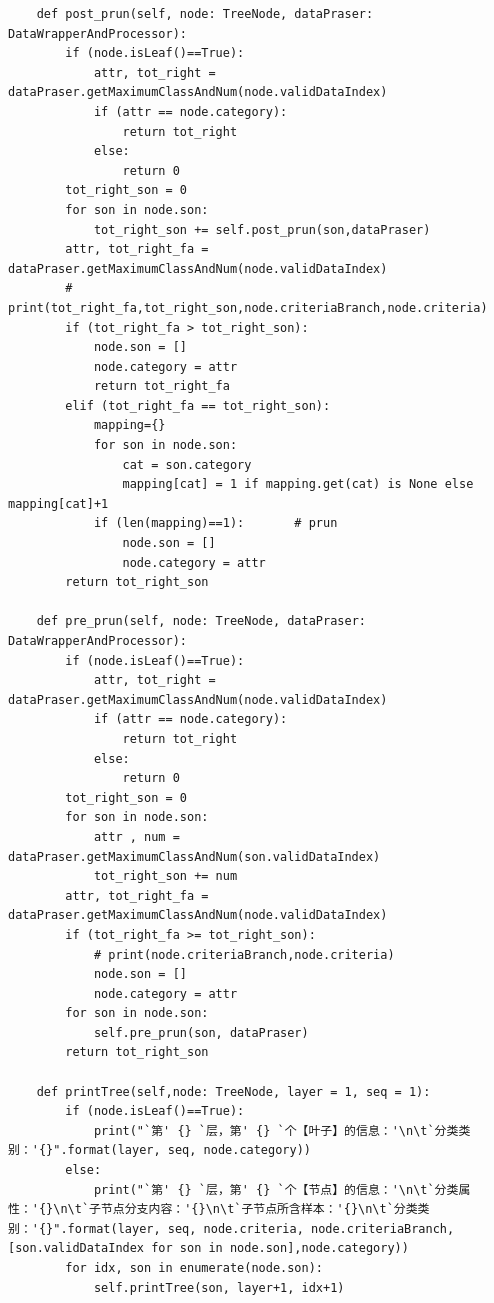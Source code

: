 \documentclass{ctexart}
\begin{document}
\begin{lstlisting}
    def post_prun(self, node: TreeNode, dataPraser: DataWrapperAndProcessor):
        if (node.isLeaf()==True):
            attr, tot_right = dataPraser.getMaximumClassAndNum(node.validDataIndex)
            if (attr == node.category):
                return tot_right
            else: 
                return 0
        tot_right_son = 0
        for son in node.son:
            tot_right_son += self.post_prun(son,dataPraser)
        attr, tot_right_fa = dataPraser.getMaximumClassAndNum(node.validDataIndex)
        # print(tot_right_fa,tot_right_son,node.criteriaBranch,node.criteria)
        if (tot_right_fa > tot_right_son):
            node.son = []
            node.category = attr
            return tot_right_fa
        elif (tot_right_fa == tot_right_son):
            mapping={}
            for son in node.son:
                cat = son.category
                mapping[cat] = 1 if mapping.get(cat) is None else mapping[cat]+1
            if (len(mapping)==1):       # prun
                node.son = []
                node.category = attr
        return tot_right_son

    def pre_prun(self, node: TreeNode, dataPraser: DataWrapperAndProcessor):
        if (node.isLeaf()==True):
            attr, tot_right = dataPraser.getMaximumClassAndNum(node.validDataIndex)
            if (attr == node.category):
                return tot_right
            else: 
                return 0
        tot_right_son = 0
        for son in node.son:
            attr , num = dataPraser.getMaximumClassAndNum(son.validDataIndex)
            tot_right_son += num
        attr, tot_right_fa = dataPraser.getMaximumClassAndNum(node.validDataIndex)
        if (tot_right_fa >= tot_right_son):
            # print(node.criteriaBranch,node.criteria)
            node.son = []
            node.category = attr
        for son in node.son:
            self.pre_prun(son, dataPraser)
        return tot_right_son
    
    def printTree(self,node: TreeNode, layer = 1, seq = 1):
        if (node.isLeaf()==True):
            print("`第' {} `层，第' {} `个【叶子】的信息：'\n\t`分类类别：'{}".format(layer, seq, node.category))
        else:
            print("`第' {} `层，第' {} `个【节点】的信息：'\n\t`分类属性：'{}\n\t`子节点分支内容：'{}\n\t`子节点所含样本：'{}\n\t`分类类别：'{}".format(layer, seq, node.criteria, node.criteriaBranch,[son.validDataIndex for son in node.son],node.category))
        for idx, son in enumerate(node.son):
            self.printTree(son, layer+1, idx+1)


\end{lstlisting}
\end{document}
